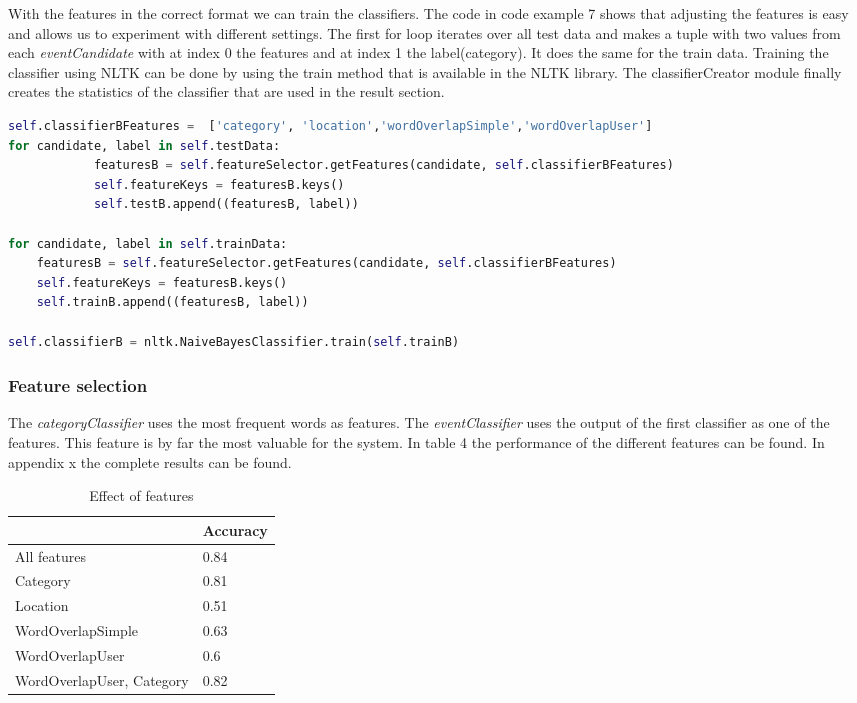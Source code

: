 \documentclass[
10pt, %
a4paper, %
oneside, %
headinclude,footinclude, %
BCOR5mm, %
]{scrartcl}
\begin{document}
With the features in the correct format we can train the classifiers. The code in code example 7 shows that adjusting the features is easy and allows us to experiment with different settings. The first for loop iterates over all test data and makes a tuple with two values from each \textit{eventCandidate} with at index 0 the features and at index 1 the label(category). It does the same for the train data. Training the classifier using NLTK can be done by using the train method that is available in the NLTK library. The classifierCreator module finally creates the statistics of the classifier that are used in the result section.

\begin{lstlisting}[language=Python, caption=Selecting features]
self.classifierBFeatures =  ['category', 'location','wordOverlapSimple','wordOverlapUser']
for candidate, label in self.testData:
            featuresB = self.featureSelector.getFeatures(candidate, self.classifierBFeatures)   
            self.featureKeys = featuresB.keys()
            self.testB.append((featuresB, label)) 
            
for candidate, label in self.trainData:
    featuresB = self.featureSelector.getFeatures(candidate, self.classifierBFeatures)
    self.featureKeys = featuresB.keys()
    self.trainB.append((featuresB, label))

self.classifierB = nltk.NaiveBayesClassifier.train(self.trainB)
\end{lstlisting}




\subsubsection{Feature selection}
The \textit{categoryClassifier} uses the most frequent words as features. The \textit{eventClassifier} uses the output of the first classifier as one of the features. This feature is by far the most valuable for the system. In table 4 the performance of the different features can be found. In appendix x the complete results can be found.


\begin{table}[h]
\caption[Effect of features]{Effect of features  }
\begin{tabular}{|l|l|}
\hline
                          & Accuracy \\ \hline
All features              & 0.84     \\ \hline
Category                  & 0.81     \\ \hline
Location                  & 0.51     \\ \hline
WordOverlapSimple         & 0.63     \\ \hline
WordOverlapUser           & 0.6      \\ \hline
WordOverlapUser, Category & 0.82     \\ \hline
\end{tabular}

\end{table}
\end{document}
